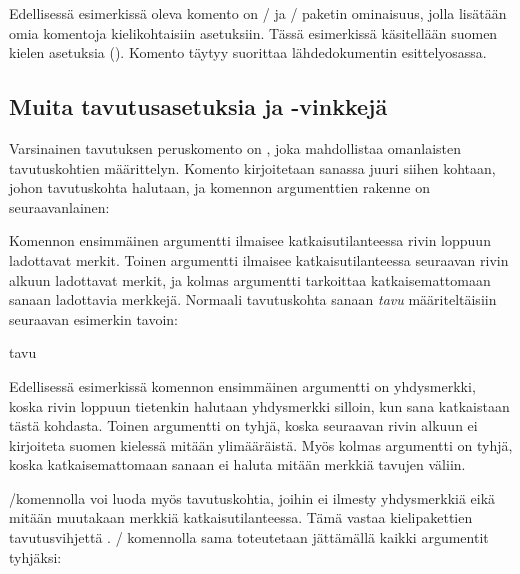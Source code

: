 \begin{koodilohkosis}
\end{koodilohkosis}

\noindent
Edellisessä esimerkissä oleva komento  on
\-/{} ja \-/ paketin ominaisuus,
jolla lisätään omia komentoja kielikohtaisiin asetuksiin. Tässä
esimerkissä käsitellään suomen kielen asetuksia
(). Komento täytyy suorittaa lähdedokumentin
esittelyosassa.

\subsection{Muita tavutusasetuksia ja -vinkkejä}
\label{luku/tavutus-muut}

Varsinainen tavutuksen peruskomento on , joka
mahdollistaa omanlaisten tavutuskohtien määrittelyn. Komento
kirjoitetaan sanassa juuri siihen kohtaan, johon tavutuskohta halutaan,
ja komennon argumenttien rakenne on seuraavanlainen:

\begin{koodilohkosis}
\end{koodilohkosis}

\noindent
Komennon ensimmäinen argumentti  ilmaisee
katkaisutilanteessa rivin loppuun ladottavat merkit. Toinen argumentti
 ilmaisee katkaisutilanteessa seuraavan rivin alkuun
ladottavat merkit, ja kolmas argumentti tarkoittaa katkaisemattomaan
sanaan ladottavia merkkejä. Normaali tavutuskohta sanaan \emph{tavu}
määriteltäisiin seuraavan esimerkin tavoin:

\begin{koodilohkosis}
ta\discretionary{-}{}{}vu
\end{koodilohkosis}

\noindent
Edellisessä esimerkissä komennon ensimmäinen argumentti on yhdysmerkki,
koska rivin loppuun tietenkin halutaan yhdysmerkki silloin, kun sana
katkaistaan tästä kohdasta. Toinen argumentti on tyhjä, koska seuraavan
rivin alkuun ei kirjoiteta suomen kielessä mitään ylimääräistä. Myös
kolmas argumentti on tyhjä, koska katkaisemattomaan sanaan ei haluta
mitään merkkiä tavujen väliin.

\-/komennolla voi luoda myös tavutuskohtia,
joihin ei ilmesty yhdysmerkkiä eikä mitään muutakaan merkkiä
katkaisutilanteessa. Tämä vastaa kielipakettien tavutusvihjettä
\koodi{\textquotedbl\textquotedbl}. \-/
komennolla sama toteutetaan jättämällä kaikki argumentit tyhjäksi:

